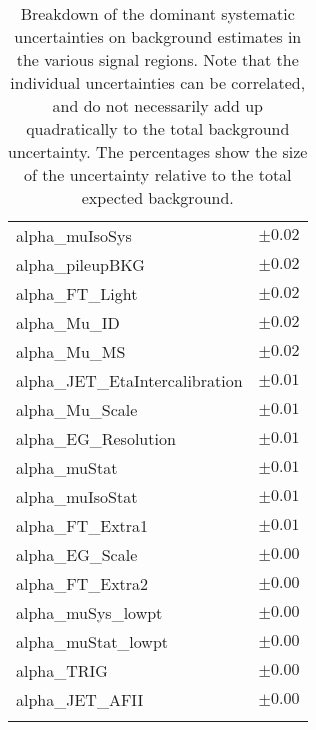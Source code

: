 \begin{table}
\begin{center}
\begin{tabular*}{\textwidth}{@{\extracolsep{\fill}}lc}
alpha\_muIsoSys         & $\pm 0.02$       \\
alpha\_pileupBKG         & $\pm 0.02$       \\
alpha\_FT\_Light         & $\pm 0.02$       \\
alpha\_Mu\_ID         & $\pm 0.02$       \\
alpha\_Mu\_MS         & $\pm 0.02$       \\
alpha\_JET\_EtaIntercalibration         & $\pm 0.01$       \\
alpha\_Mu\_Scale         & $\pm 0.01$       \\
alpha\_EG\_Resolution         & $\pm 0.01$       \\
alpha\_muStat         & $\pm 0.01$       \\
alpha\_muIsoStat         & $\pm 0.01$       \\
alpha\_FT\_Extra1         & $\pm 0.01$       \\
alpha\_EG\_Scale         & $\pm 0.00$       \\
alpha\_FT\_Extra2         & $\pm 0.00$       \\
alpha\_muSys\_lowpt         & $\pm 0.00$       \\
alpha\_muStat\_lowpt         & $\pm 0.00$       \\
alpha\_TRIG         & $\pm 0.00$       \\
alpha\_JET\_AFII         & $\pm 0.00$       \\
\noalign{\smallskip}\hline\noalign{\smallskip}
\end{tabular*}
\end{center}
\caption[Breakdown of uncertainty on background estimates]{
Breakdown of the dominant systematic uncertainties on background estimates in the various signal regions.
Note that the individual uncertainties can be correlated, and do not necessarily add up quadratically to 
the total background uncertainty. The percentages show the size of the uncertainty relative to the total expected background.
\label{table.results.bkgestimate.uncertainties.SR1b2}}
\end{table}
\clearpage
%